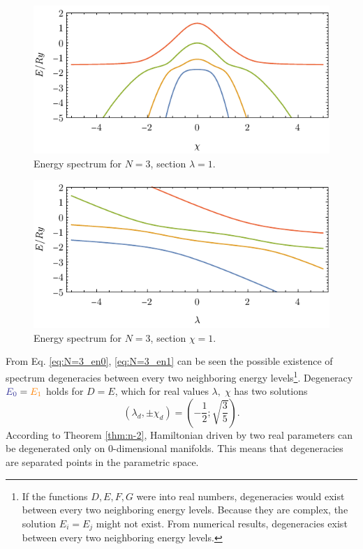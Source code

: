 \begin{figure}[h]
    \centering
    \includegraphics[scale=1.3]{../img/N=3_energiesl.pdf}
    \vspace{-3pt}\caption{Energy spectrum for $N=3$, section $\lambda=1$.}
    \label{fig:N=3_energiesl}
\end{figure}
\begin{figure}[h]
    \centering
    \includegraphics[scale=1.3]{../img/N=3_energiesc.pdf}
    \vspace{-3pt}\caption{Energy spectrum for $N=3$, section $\chi=1$.}
    \label{fig:N=3_energiesc}
\end{figure}

From Eq. \ref{eq:N=3_en0}, \ref{eq:N=3_en1} can be seen the possible existence of spectrum degeneracies between every two neighboring energy levels\footnote{If the functions $D,E,F,G$ were into real numbers, degeneracies would exist between every two neighboring energy levels. Because they are complex, the solution $E_i=E_j$ might not exist. From numerical results, degeneracies exist between every two neighboring energy levels.}. Degeneracy $\bluee{E_0}=\textcolor{orange}{E_1}$ holds for $D=E$, which for real values $\lambda,\;\chi$ has two solutions
\begin{equation}
    (\lambda_d,\pm \chi_d)=\left(-\frac{1}{2};\sqrt{\frac{3}{5}}\right).
\end{equation}
According to Theorem \ref{thm:n-2}, Hamiltonian driven by two real parameters can be degenerated only on 0-dimensional manifolds. This means that degeneracies are separated points in the parametric space.

